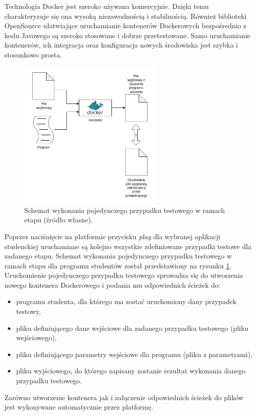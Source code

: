 Technologia Docker jest szeroko używana komercyjnie.
Dzięki temu charakteryzuje się ona wysoką niezawodnością i stabilnością.
Również biblioteki OpenSource ułatwiające uruchamianie kontenerów Dockerowych bezpośrednio z kodu Javowego są szeroko stosowane i dobrze przetestowane.
Samo uruchamianie kontenerów, ich integracja oraz konfiguracja nowych środowiska jest szybka i stosunkowo prosta.

\begin{figure}[h]
    \centering
    \includegraphics[width = 7cm]{chapter05/single_test_case.png}
    \caption{Schemat wykonania pojedynczego przypadku testowego w ramach etapu (źródło własne).}
    \label{fig:single-test-case}
\end{figure}

Poprzez naciśnięcie na platformie przycisku \textit{play} dla wybranej aplikacji studenckiej uruchamiane są kolejno wszystkie zdefiniowane przypadki testowe dla zadanego etapu.
Schemat wykonania pojedynczego przypadku testowego w ramach etapu dla programu studentów został przedstawiony na rysunku \ref{fig:single-test-case}.
Uruchomienie pojedynczego przypadku testowego sprowadza się do utworzenia nowego kontenera Dockerowego i podania mu odpowiednich ścieżek do:
\begin{itemize}
    \item programu studenta, dla którego ma zostać uruchomiony dany przypadek testowy,
    \item pliku definiującego dane wejściowe dla zadanego przypadku testowego (pliku wejściowego),
    \item pliku definiującego parametry wejściowe dla programu (pliku z parametrami),
    \item pliku wyjściowego, do którego zapisany zostanie rezultat wykonania danego przypadku testowego.
\end{itemize}
Zarówno utworzenie kontenera jak i załączenie odpowiednich ścieżek do plików jest wykonywane automatycznie przez platformę.

